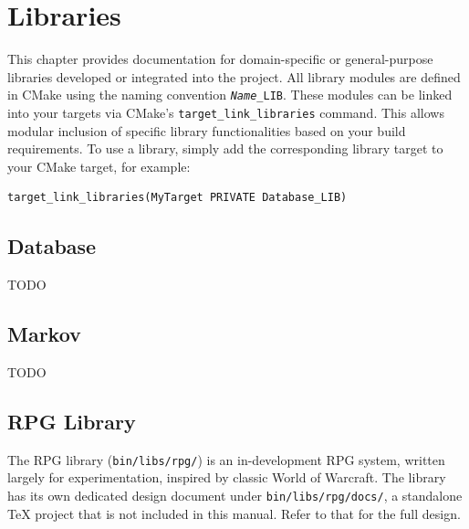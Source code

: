 \chapter{Libraries}
\label{chapter:libraries}

This chapter provides documentation for domain-specific or general-purpose libraries developed or integrated into the project. All library modules are defined in CMake using the naming convention \texttt{\textit{Name}\_LIB}. These modules can be linked into your targets via CMake's \texttt{target\_link\_libraries} command. This allows modular inclusion of specific library functionalities based on your build requirements. To use a library, simply add the corresponding library target to your CMake target, for example:
\begin{lstlisting}[style=cppstyle]
target_link_libraries(MyTarget PRIVATE Database_LIB)
\end{lstlisting}




\section{Database}
\label{section:database}

TODO 






\section{Markov}
\label{section:markov}

TODO 









\section{RPG Library}
\label{section:rpg}

The RPG library (\texttt{bin/libs/rpg/}) is an in-development RPG system, written largely for experimentation, inspired by classic World of Warcraft. The library has its own dedicated design document under \texttt{bin/libs/rpg/docs/}, a standalone TeX project that is not included in this manual. Refer to that for the full design.
